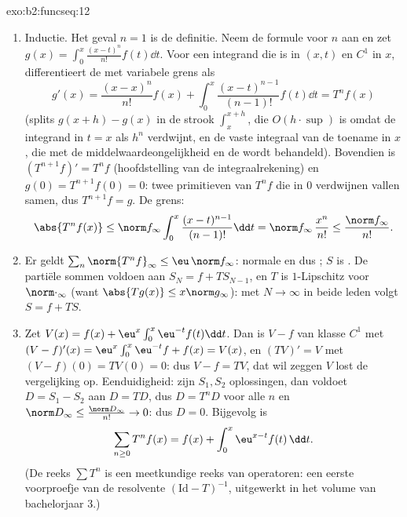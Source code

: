 \begin{solution}{exo:b2:funcseq:12}
\begin{enumerate}
  \item Inductie. Het geval $n = 1$ is de definitie. Neem de
        formule voor $n$ aan en zet $g(x) = \int_0^x
        \frac{(x-t)^n}{n!} f(t)\dd t$. Voor een integrand die
         is in $(x,t)$ en $C^1$ in $x$, differentieert de
         met variabele grens als
        \[
        g'(x) = \frac{(x-x)^n}{n!}f(x)
        + \int_0^x \frac{(x-t)^{n-1}}{(n-1)!}f(t)\dd t
        = T^nf(x)
        \]
        (splits $g(x+h) - g(x)$ in de strook $\int_x^{x+h}$, die
        $O(h\cdot\sup)$ is omdat de integrand in $t = x$ als $h^n$
        verdwijnt, en de vaste integraal van de toename in $x$, die
        met de middelwaardeongelijkheid en de  wordt
        behandeld). Bovendien is $(T^{n+1}f)' = T^nf$
        (hoofdstelling van de integraalrekening) en $g(0) =
        T^{n+1}f(0) = 0$: twee primitieven van $T^nf$ die in $0$
        verdwijnen vallen samen, dus $T^{n+1}f = g$. De grens:
        \[
        \abs{T^nf(x)} \leq \norm f_\infty
        \int_0^x \frac{(x-t)^{n-1}}{(n-1)!}\dd t
        = \norm f_\infty\,\frac{x^n}{n!}
        \leq \frac{\norm f_\infty}{n!} .
        \]
  \item Er geldt $\sum_n \norm{T^nf}_\infty \leq \eu\,\norm
        f_\infty$: normale en dus ; $S$ is
        . De partiële sommen voldoen aan $S_N = f + T
        S_{N-1}$, en $T$ is $1$-Lipschitz voor $\norm\cdot_\infty$
        (want $\abs{Tg(x)} \leq x\norm g_\infty$): met $N \to
        \infty$ in beide leden volgt $S = f + TS$.
  \item Zet $V(x) = f(x) + \eu^x\int_0^x \eu^{-t}f(t)\dd t$. Dan is
        $V - f$ van klasse $C^1$ met $(V-f)'(x) =
        \eu^x\int_0^x\eu^{-t}f + f(x) = V(x)$, en $(TV)' = V$ met
        $(V - f)(0) = TV(0) = 0$: dus $V - f = TV$, dat wil zeggen
        $V$ lost de vergelijking op. Eenduidigheid: zijn $S_1,
        S_2$  oplossingen, dan voldoet $D = S_1 - S_2$ aan
        $D = TD$, dus $D = T^nD$ voor alle $n$ en $\norm D_\infty
        \leq \frac{\norm D_\infty}{n!} \to 0$: dus $D = 0$.
        Bijgevolg is
        \[
        \sum_{n\geq0} T^nf(x) = f(x) +
        \int_0^x \eu^{x-t}f(t)\,\dd t .
        \]
        (De reeks $\sum T^n$ is een meetkundige reeks van
        operatoren: een eerste voorproefje van de resolvente
        $(\mathrm{Id} - T)^{-1}$, uitgewerkt in het volume van
        bachelorjaar 3.)
\end{enumerate}
\end{solution}

